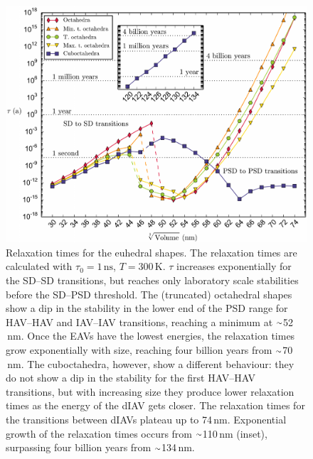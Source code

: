 \documentclass[review]{elsarticle}
\newcommand{\roughly}{{\raise.17ex\hbox{$\scriptstyle\sim$}}}
\begin{document}
\allowdisplaybreaks

\begin{figure}[ht]
\centering
\includegraphics[width=\textwidth]{Figure_09.pdf}
\caption{Relaxation times for the euhedral shapes. The relaxation times are calculated with $\tau_0=1\,\text{ns}$, $T=300\,\text{K}$. $\tau$ increases exponentially for the SD--SD transitions, but reaches only laboratory scale stabilities before the SD--PSD threshold. The (truncated) octahedral shapes show a dip in the stability in the lower end of the PSD range for HAV--HAV and IAV--IAV transitions, reaching a minimum at $\roughly$52$\,\text{nm}$. Once the EAVs have the lowest energies, the relaxation times grow exponentially with size, reaching four billion years from $\roughly$70$\,\text{nm}$. The cuboctahedra, however, show a different behaviour: they do not show a dip in the stability for the first HAV--HAV transitions, but with increasing size they produce lower relaxation times as the energy of the dIAV gets closer. The relaxation times for the transitions between dIAVs plateau up to 74$\,\text{nm}$. Exponential growth of the relaxation times occurs from $\roughly$110$\,\text{nm}$ (inset), surpassing four billion years from $\roughly$134$\,\text{nm}$.}
\label{fig9}
\end{figure}
\end{document}
